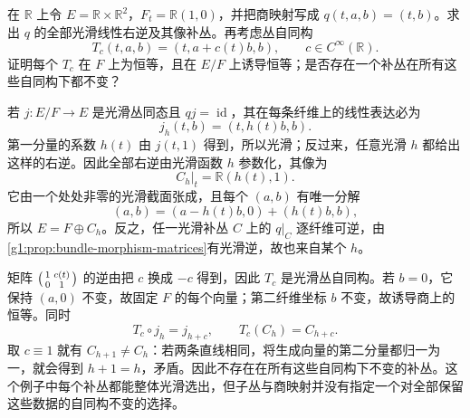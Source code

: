\begin{exercise}\label{g1:ex:quotient-complement-shears}
	在 \(\mathbb R\) 上令 \(E=\mathbb R\times\mathbb R^2\)，\(F_t=\mathbb R(1,0)\)，并把商映射写成 \(q(t,a,b)=(t,b)\)。求出 \(q\) 的全部光滑线性右逆及其像补丛。再考虑丛自同构
	\[
		T_c(t,a,b)=(t,a+c(t)b,b),\qquad c\in C^\infty(\mathbb R).
	\]
	证明每个 \(T_c\) 在 \(F\) 上为恒等，且在 \(E/F\) 上诱导恒等；是否存在一个补丛在所有这些自同构下都不变？
\end{exercise}
\begin{solution}
	若 \(j:E/F\to E\) 是光滑丛同态且 \(qj=\operatorname{id}\)，其在每条纤维上的线性表达必为
	\[
		j_h(t,b)=(t,h(t)b,b).
	\]
	第一分量的系数 \(h(t)\) 由 \(j(t,1)\) 得到，所以光滑；反过来，任意光滑 \(h\) 都给出这样的右逆。因此全部右逆由光滑函数 \(h\) 参数化，其像为
	\[
		C_h|_t=\mathbb R(h(t),1).
	\]
	它由一个处处非零的光滑截面张成，且每个 \((a,b)\) 有唯一分解
	\[
		(a,b)=(a-h(t)b,0)+(h(t)b,b),
	\]
	所以 \(E=F\oplus C_h\)。反之，任一光滑补丛 \(C\) 上的 \(q|_C\) 逐纤维可逆，由\cref{g1:prop:bundle-morphism-matrices}有光滑逆，故也来自某个 \(h\)。

	矩阵 \(\begin{psmallmatrix}1&c(t)\\0&1\end{psmallmatrix}\) 的逆由把 \(c\) 换成 \(-c\) 得到，因此 \(T_c\) 是光滑丛自同构。若 \(b=0\)，它保持 \((a,0)\) 不变，故固定 \(F\) 的每个向量；第二纤维坐标 \(b\) 不变，故诱导商上的恒等。同时
	\[
		T_c\circ j_h=j_{h+c},\qquad T_c(C_h)=C_{h+c}.
	\]
	取 \(c\equiv1\) 就有 \(C_{h+1}\ne C_h\)：若两条直线相同，将生成向量的第二分量都归一为一，就会得到 \(h+1=h\)，矛盾。因此不存在在所有这些自同构下不变的补丛。这个例子中每个补丛都能整体光滑选出，但子丛与商映射并没有指定一个对全部保留这些数据的自同构不变的选择。
\end{solution}

